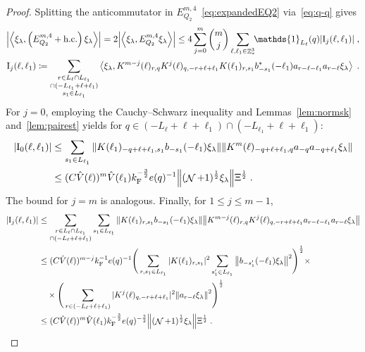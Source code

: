 \documentclass[12pt,a4paper]{article}
\numberwithin{equation}{section}
\newcommand{\1}{\mathbb{I}}
\newcommand{\F}{\mathrm{F}}
\newcommand{\I}{\mathrm{I}}
\DeclareMathOperator{\Z}{\mathbb{Z}}
\DeclareMathOperator{\NN}{\mathcal{N}}
\newcommand{\half}{\frac{1}{2}}
\newcommand{\eva}[1]{\left\langle #1 \right\rangle}
\theoremstyle{plain}
\theoremstyle{definition}
\theoremstyle{remark}
\theoremstyle{plain}
\theoremstyle{definition}
\theoremstyle{remark}
\begin{document}
\begin{proof}
Splitting the anticommutator in $ E^{m,4}_{Q_2} $~\eqref{eq:expandedEQ2} via~\eqref{eq:q-q} gives
\begin{equation} \label{eq:EQ2171}
\begin{aligned}
	\abs{\eva{\xi_\lambda,\left(E^{m,4}_{Q_2}+\mathrm{h.c.}\right) \xi_\lambda }} 
	= 2\abs{\eva{\xi_\lambda, E^{m,4}_{Q_2} \xi_\lambda }}
	\le 4 \sum_{j=0}^m {{m}\choose j} \sum_{\ell,\ell_1 \in \Z^3_*}\!\! \mathds{1}_{L_\ell}(q) |\I_j(\ell, \ell_1)| \;,\\
	\I_j(\ell, \ell_1)
	\coloneq \sum_{\substack{r\in L_{\ell} \cap L_{\ell_1}\\ \cap (-L_{\ell_1}+\ell+\ell_1)\\ s_1 \in L_{\ell_1}}}
		\eva{\xi_\lambda, K^{m-j}(\ell)_{r,q} K^{j}(\ell)_{q,-r+\ell+\ell_1} K(\ell_1)_{r,s_1} b^*_{-s_1}(-\ell_1) a_{r-\ell-\ell_1} a_{r-\ell} \xi_\lambda} \;. \\
\end{aligned}
\end{equation}
For $ j = 0 $, employing the Cauchy--Schwarz inequality and Lemmas~\ref{lem:normsk} and~\ref{lem:pairest} yields for $ q \in (-L_\ell + \ell + \ell_1) \cap (-L_{\ell_1} + \ell + \ell_1) $:
\begin{align}
	|\I_0(\ell, \ell_1)|
	&\leq \sum_{s_1 \in L_{\ell_1}}
		\norm{K(\ell_1)_{-q+\ell+\ell_1,s_1} b_{-s_1}(-\ell_1) \xi_\lambda}
		\norm{ K^m(\ell)_{-q+\ell+\ell_1,q}a_{-q}a_{-q+\ell_1} \xi_\lambda } \nonumber\\
	&\leq (C \hat{V}(\ell))^m
		\hat{V}(\ell_1)
		k_{\F}^{-\frac 32} e(q)^{-1}
		\norm{(\NN+1)^\half\xi_\lambda} \Xi^\half \;. \label{eq:estEQ2171}
\end{align}
The bound for $ j = m $ is analogous. Finally, for $ 1 \le j \le m-1 $,
\begin{align}
	|\I_j(\ell, \ell_1)|
	&\leq \sum_{\substack{r\in L_{\ell} \cap L_{\ell_1} \\ \cap (-L_{\ell}+\ell+\ell_1)}}
		\sum_{s_1\in L_{\ell_1}} \norm{K(\ell_1)_{r,s_1} b_{-s_1}(-\ell_1) \xi_\lambda}\norm{ K^{m-j}(\ell)_{r,q} K^j(\ell)_{q,-r+\ell+\ell_1} a_{r-\ell-\ell_1} a_{r-\ell} \xi_\lambda } \nonumber\\
	&\leq (C \hat{V}(\ell))^{m-j} k_{\F}^{-1} e(q)^{-1}
		\Bigg( \sum_{r,s_1\in L_{\ell_1}}
		|K(\ell_1)_{r,s_1}|^2
		\sum_{s_1'\in L_{\ell_1}}
		\norm{b_{-s_1'}(-\ell_1) \xi_\lambda}^2 \Bigg)^{\half} \times \nonumber\\
		&\quad \times \Bigg( \sum_{r\in (-L_{\ell}+\ell+\ell_1)}
		|K^j(\ell)_{q,-r+\ell+\ell_1}|^2
		\norm{ a_{r-\ell} \xi_\lambda }^2 \Bigg)^{\half} \nonumber\\
	&\leq (C \hat{V}(\ell))^m
		\hat{V}(\ell_1)
		k_{\F}^{-\frac 32} e(q)^{-\frac 32}
		\norm{(\NN+1)^\half\xi_\lambda} \Xi^{\half} \;. \label{eq:estEQ2172}
\end{align}
\end{proof}
\end{document}
